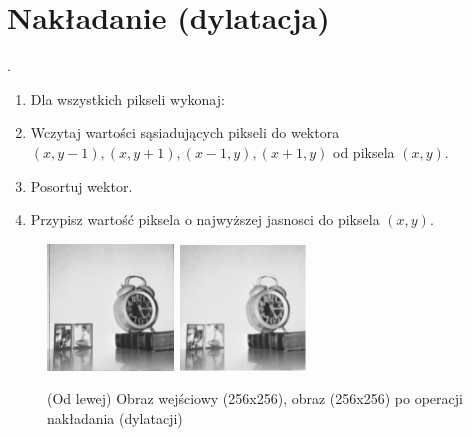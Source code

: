 \documentclass[final,a4paper,openany,12pt]{mwbk}
\begin{document}
\section{ Nakładanie (dylatacja)}
.\hfill\\
\indent
\begin{enumerate}	
		\item Dla wszystkich pikseli wykonaj:
		\item Wczytaj wartości sąsiadujących pikseli do wektora $(x,y-1),(x,y+1),(x-1,y),(x+1,y)$ od piksela $(x,y)$.
		\item Posortuj wektor.
		\item Przypisz wartość piksela o najwyższej jasnosci do piksela $(x,y)$.
	\end{enumerate}
\begin{figure}[H]
	\begin{center}
		\includegraphics[width=0.3\textwidth]{1/1Gray_D_Original}
		\includegraphics[width=0.3\textwidth]{1/1Gray_D_Result}
	\end{center}
	\caption{(Od lewej) Obraz wejściowy (256x256), obraz (256x256) po operacji nakładania (dylatacji) }
\end{figure}
\end{document}
